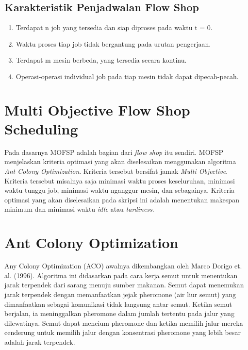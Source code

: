 \subsection{Karakteristik Penjadwalan Flow Shop}
\begin{enumerate}
	\item Terdapat n job yang tersedia dan siap diproses pada waktu t = 0.
	\item Waktu proses tiap job tidak bergantung pada urutan pengerjaan.
	\item Terdapat m mesin berbeda, yang tersedia secara kontinu.
	\item Operasi-operasi individual job pada tiap mesin tidak dapat dipecah-pecah.
\end{enumerate}

\section{Multi Objective Flow Shop Scheduling}
Pada dasarnya MOFSP adalah bagian dari {\it flow shop } itu sendiri. MOFSP menjelaskan kriteria optimasi yang akan diselesaikan menggunakan algoritma {\it Ant Colony Optimization}. Kriteria tersebut bersifat jamak {\it Multi Objective}. Kriteria tersebut misalnya saja minimasi waktu proses keseluruhan, minimasi waktu tunggu job, minimasi waktu nganggur mesin, dan sebagainya. Kriteria optimasi yang akan diselesaikan pada skripsi ini adalah menentukan makespan minimum dan minimasi waktu {\it idle} atau {\it tardiness}.

\section{Ant Colony Optimization}
Any Colony Optimization (ACO) awalnya dikembangkan oleh Marco Dorigo et. al. (1996). Algoritma ini didasarkan pada cara kerja semut untuk menentukan jarak terpendek dari sarang menuju sumber makanan. Semut dapat menemukan jarak terpendek dengan memanfaatkan jejak pheromone (air liur semut) yang dimanfaatkan sebagai komunikasi tidak langsung antar semut. Ketika semut berjalan, ia meninggalkan pheromone dalam jumlah tertentu pada jalur yang dilewatinya. Semut dapat mencium pheromone dan ketika memilih jalur mereka cenderung untuk memilih jalur dengan konsentrasi pheromone yang lebih besar adalah jarak terpendek.

